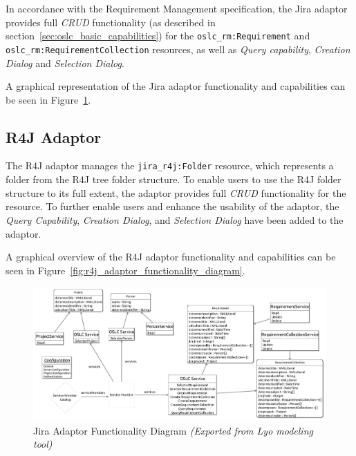 In accordance with the Requirement Management specification, the Jira adaptor provides full \emph{CRUD} functionality (as described in section \ref{sec:oslc_basic_capabilities}) for the \texttt{oslc\_rm:Requirement} and \texttt{oslc\_rm:RequirementCollection} resources, as well as \emph{Query capability}, \emph{Creation Dialog} and \emph{Selection Dialog}.

A graphical representation of the Jira adaptor functionality and capabilities can be seen in Figure \ref{fig:jira_adaptor_functionality_diagram}.

\subsection*{R4J Adaptor}
The R4J adaptor manages the \texttt{jira\_r4j:Folder} resource, which represents a folder from the R4J tree folder structure. To enable users to use the R4J folder structure to its full extent, the adaptor provides full \emph{CRUD} functionality for the resource. To further enable users and enhance the usability of the adaptor, the \emph{Query Capability}, \emph{Creation Dialog}, and \emph{Selection Dialog} have been added to the adaptor.

A graphical overview of the R4J adaptor functionality and capabilities can be seen in Figure \ref{fig:r4j_adaptor_functionality_diagram}.

\begin{figure}[H]
  \centering
  \begin{sideways}
    \includegraphics[width=1.4\linewidth]{figures/JiraInterfaceDiagram.jpg} 
  \end{sideways}
  \caption{Jira Adaptor Functionality Diagram \emph{(Exported from Lyo modeling tool)}}
  \label{fig:jira_adaptor_functionality_diagram}
\end{figure}

